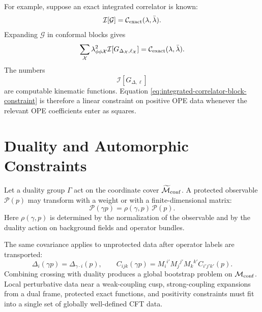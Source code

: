 For example, suppose an exact integrated correlator is known:
\[
  \mathcal I[\mathcal G]=\mathcal C_{\rm exact}(\lambda,\bar\lambda).
\]
Expanding \(\mathcal G\) in conformal blocks gives
\begin{equation}
  \sum_{\mathcal X}
  \lambda_{\phi\phi\mathcal X}^2
  \mathcal I\!\left[
    G_{\Delta_{\mathcal X},\ell_{\mathcal X}}
  \right]
  =
  \mathcal C_{\rm exact}(\lambda,\bar\lambda).
  \label{eq:integrated-correlator-block-constraint}
\end{equation}
The numbers
\[
  \mathcal I\!\left[
    G_{\Delta,\ell}
  \right]
\]
are computable kinematic functions.  Equation
\eqref{eq:integrated-correlator-block-constraint} is therefore a linear
constraint on positive OPE data whenever the relevant OPE coefficients enter
as squares.

\section{Duality and Automorphic Constraints}

Let a duality group \(\Gamma\) act on the coordinate cover
\(\widetilde{\mathcal M}_{\rm conf}\).  A protected observable
\(\mathcal P(p)\) may transform with a weight or with a finite-dimensional
matrix:
\[
  \mathcal P(\gamma p)
  =
  \rho(\gamma,p)\,\mathcal P(p).
\]
Here \(\rho(\gamma,p)\) is determined by the normalization of the observable
and by the duality action on background fields and operator bundles.

The same covariance applies to unprotected data after operator labels are
transported:
\[
  \Delta_i(\gamma p)=\Delta_{\gamma\cdot i}(p),
  \qquad
  C_{ijk}(\gamma p)
  =
  M_i{}^{i'}M_j{}^{j'}M_k{}^{k'}C_{i'j'k'}(p).
\]
Combining crossing with duality produces a global bootstrap problem on
\(\mathcal M_{\rm conf}\).  Local perturbative data near a weak-coupling cusp,
strong-coupling expansions from a dual frame, protected exact functions, and
positivity constraints must fit into a single set of globally well-defined
CFT data.

